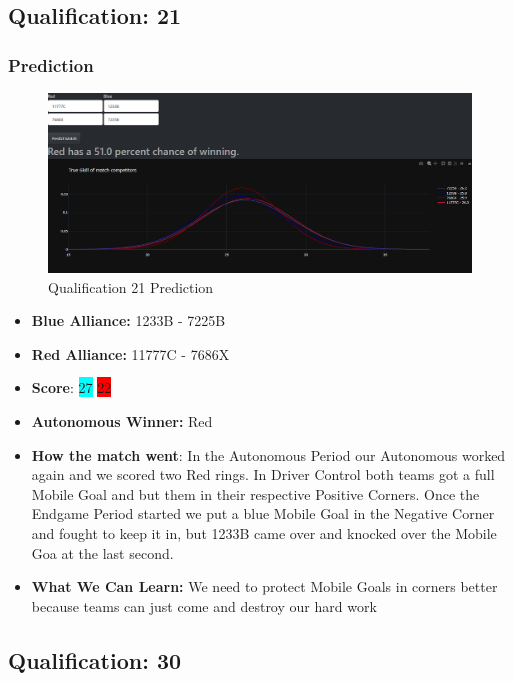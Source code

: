 \subsection*{Qualification: 21}
\subsubsection*{Prediction}
\begin{figure}[H]
    \centering
    \includegraphics[width=0.8\linewidth]{images/Q21ND.png}
    \caption{Qualification 21 Prediction}
    \label{fig:Qual-21-ND}
\end{figure}
\begin{itemize}
    \item \textbf{Blue Alliance:} 1233B - 7225B 
    \item \textbf{Red Alliance:} 11777C - 7686X
    \item \textbf{Score}: \colorbox{cyan}{27}
    \colorbox{red}{22}
    \item \textbf{Autonomous Winner:} Red 
    \item \textbf{How the match went}: In the Autonomous Period our Autonomous worked again and we scored two Red rings. In Driver Control both teams got a full Mobile Goal and but them in their respective Positive Corners. Once the Endgame Period started we put a blue Mobile Goal in the Negative Corner and fought to keep it in, but 1233B came over and knocked over the Mobile Goa at the last second.
    \item \textbf{What We Can Learn:} We need to protect Mobile Goals in corners better because teams can just come and destroy our hard work
\end{itemize}

\subsection*{Qualification: 30}
